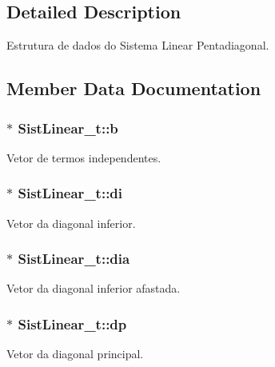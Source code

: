 \subsection{Detailed Description}
Estrutura de dados do Sistema Linear Pentadiagonal. 

\subsection{Member Data Documentation}
\subsubsection[{\texorpdfstring{b}{b}}]{$\ast$ Sist\+Linear\+\_\+t\+::b}\hypertarget{structSistLinear__t_a5f554632eec68e5e0dbea0058c9657ac}{}\label{structSistLinear__t_a5f554632eec68e5e0dbea0058c9657ac}
Vetor de termos independentes. 
\subsubsection[{\texorpdfstring{di}{di}}]{$\ast$ Sist\+Linear\+\_\+t\+::di}\hypertarget{structSistLinear__t_a86345c5459d538c556dba797dccfede7}{}\label{structSistLinear__t_a86345c5459d538c556dba797dccfede7}
Vetor da diagonal inferior. 
\subsubsection[{\texorpdfstring{dia}{dia}}]{$\ast$ Sist\+Linear\+\_\+t\+::dia}\hypertarget{structSistLinear__t_ac61f29d6df1c08a55d9d571fcb82bf53}{}\label{structSistLinear__t_ac61f29d6df1c08a55d9d571fcb82bf53}
Vetor da diagonal inferior afastada. 
\subsubsection[{\texorpdfstring{dp}{dp}}]{$\ast$ Sist\+Linear\+\_\+t\+::dp}\hypertarget{structSistLinear__t_aa7f879f3d335e7973af826bc65df4a49}{}\label{structSistLinear__t_aa7f879f3d335e7973af826bc65df4a49}
Vetor da diagonal principal. 

